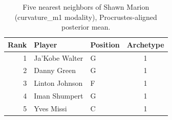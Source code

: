 \begin{table}[htbp]
  \centering\small
  \begin{tabular}{rllc}
    \toprule
    Rank & Player & Position & Archetype \\
    \midrule
    1 & Ja'Kobe Walter & G & 1 \\
    2 & Danny Green & G & 1 \\
    3 & Linton Johnson & F & 1 \\
    4 & Iman Shumpert & G & 1 \\
    5 & Yves Missi & C & 1 \\
    \bottomrule
  \end{tabular}
  \caption{Five nearest neighbors of Shawn Marion (curvature_m1 modality), Procrustes-aligned posterior mean.}
  \label{tab:Shawn_Marion_neighbors_curvature_m1}
\end{table}

